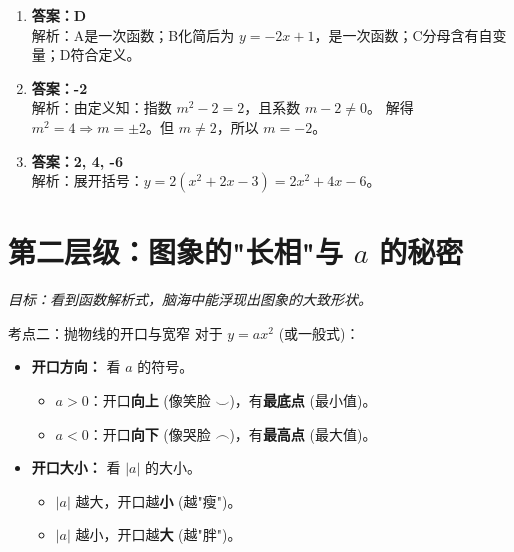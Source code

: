 \documentclass[12pt, a4paper]{article}
\begin{document}
\begin{answerbox}
    \begin{enumerate}
        \item \textbf{答案：D} \\ 
        解析：A是一次函数；B化简后为 $y = -2x + 1$，是一次函数；C分母含有自变量；D符合定义。
        
        \item \textbf{答案：-2} \\ 
        解析：由定义知：指数 $m^2 - 2 = 2$，且系数 $m - 2 \neq 0$。
        解得 $m^2 = 4 \Rightarrow m = \pm 2$。但 $m \neq 2$，所以 $m = -2$。
        
        \item \textbf{答案：2, 4, -6} \\ 
        解析：展开括号：$y = 2(x^2 + 2x - 3) = 2x^2 + 4x - 6$。
    \end{enumerate}
\end{answerbox}

\section{第二层级：图象的"长相"与 $a$ 的秘密}
\textit{目标：看到函数解析式，脑海中能浮现出图象的大致形状。}

\begin{conceptbox}{考点二：抛物线的开口与宽窄}
    对于 $y = ax^2$ (或一般式)：
    \begin{itemize}
        \item \textbf{开口方向：} 看 $a$ 的符号。
        \begin{itemize}
            \item $a > 0$：开口\textbf{向上} (像笑脸 $\smile$)，有\textbf{最底点} (最小值)。
            \item $a < 0$：开口\textbf{向下} (像哭脸 $\frown$)，有\textbf{最高点} (最大值)。
        \end{itemize}
        \item \textbf{开口大小：} 看 $|a|$ 的大小。
        \begin{itemize}
            \item $|a|$ 越大，开口越\textbf{小} (越"瘦")。
            \item $|a|$ 越小，开口越\textbf{大} (越"胖")。
        \end{itemize}
    \end{itemize}
\end{conceptbox}
\end{document}
